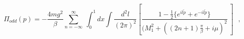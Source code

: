 \begin{equation}
\Pi_{odd}(p) = -\frac {4mg^2}{\beta}
\sum _
{n=- \infty}^{\infty
}~\int_{0}^{1} dx \int \frac {d^2l}{(2\pi)^2} [\frac {1 - \frac{1}{2}\{e^{il
\tilde p} + e^{-il\tilde p} \} }{(M_1^2 + ((2n+1)\frac {\pi}{\beta} +i\mu )^2
}~] ~~~, 
\end{equation}

